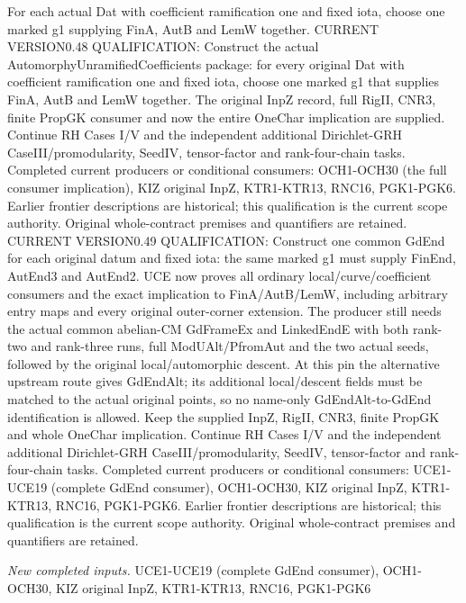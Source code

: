 For each actual Dat with coefficient ramification one and fixed iota, choose one marked g1 supplying FinA, AutB and LemW together. CURRENT VERSION0.48 QUALIFICATION: Construct the actual AutomorphyUnramifiedCoefficients package: for every original Dat with coefficient ramification one and fixed iota, choose one marked g1 that supplies FinA, AutB and LemW together. The original InpZ record, full RigII, CNR3, finite PropGK consumer and now the entire OneChar implication are supplied. Continue RH Cases I/V and the independent additional Dirichlet-GRH CaseIII/promodularity, SeedIV, tensor-factor and rank-four-chain tasks. Completed current producers or conditional consumers: OCH1-OCH30 (the full consumer implication), KIZ original InpZ, KTR1-KTR13, RNC16, PGK1-PGK6. Earlier frontier descriptions are historical; this qualification is the current scope authority. Original whole-contract premises and quantifiers are retained. CURRENT VERSION0.49 QUALIFICATION: Construct one common GdEnd for each original datum and fixed iota: the same marked g1 must supply FinEnd, AutEnd3 and AutEnd2. UCE now proves all ordinary local/curve/coefficient consumers and the exact implication to FinA/AutB/LemW, including arbitrary entry maps and every original outer-corner extension. The producer still needs the actual common abelian-CM GdFrameEx and LinkedEndE with both rank-two and rank-three runs, full ModUAlt/PfromAut and the two actual seeds, followed by the original local/automorphic descent. At this pin the alternative upstream route gives GdEndAlt; its additional local/descent fields must be matched to the actual original points, so no name-only GdEndAlt-to-GdEnd identification is allowed. Keep the supplied InpZ, RigII, CNR3, finite PropGK and whole OneChar implication. Continue RH Cases I/V and the independent additional Dirichlet-GRH CaseIII/promodularity, SeedIV, tensor-factor and rank-four-chain tasks. Completed current producers or conditional consumers: UCE1-UCE19 (complete GdEnd consumer), OCH1-OCH30, KIZ original InpZ, KTR1-KTR13, RNC16, PGK1-PGK6. Earlier frontier descriptions are historical; this qualification is the current scope authority. Original whole-contract premises and quantifiers are retained.

\emph{New completed inputs.} UCE1-UCE19 (complete GdEnd consumer), OCH1-OCH30, KIZ original InpZ, KTR1-KTR13, RNC16, PGK1-PGK6

